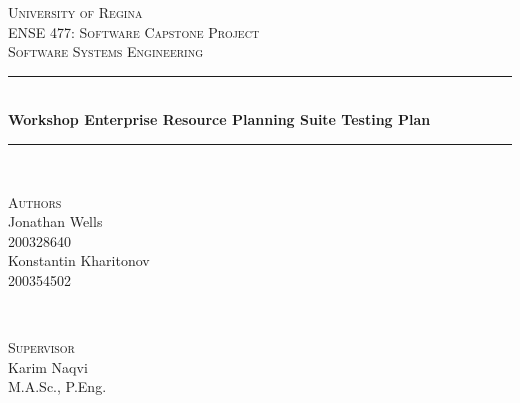 \begin{titlepage} %
	\newcommand{\HRule}{\rule{\linewidth}{0.5mm}} %
	
	\center %
	
	
	\textsc{\Huge University of Regina}\\[1.5cm] %

	\textsc{\Large ENSE 477: Software Capstone Project}\\[0.5cm]
	
	\textsc{\Large Software Systems Engineering}\\[0.5cm] %
	
	
	
	
	
	\HRule\\[0.4cm]
	
	{\Huge\bfseries Workshop Enterprise Resource Planning Suite Testing Plan}\\[0.4cm] %
	
	\HRule\\[1.5cm]
	
	
	\begin{minipage}[t]{0.4\textwidth}
		\begin{flushleft}
			\large
			\textsc{Authors}\\
			Jonathan Wells\\
			\textsc{200328640}\\ %
			\large
			Konstantin Kharitonov\\
			\textsc{200354502} %
		\end{flushleft}
		
	\end{minipage}
	~
	\begin{minipage}[t]{0.4\textwidth}
		\begin{flushright}
			\large
			\textsc{Supervisor}\\ %
			Karim Naqvi\\
			M.A.Sc., P.Eng.\\
		\end{flushright}
	\end{minipage}
	

\end{titlepage}
